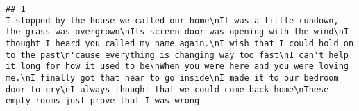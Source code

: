 \documentclass[]{article}
\begin{document}
\begin{verbatim}
## 1                                                                                                                                                                                                                                                                                                                                                                                                                                                                                                                                                                                                                                                                                                                                                                                                                                                                                                                                                                                                                                                                                                                                                                                                                                                                                                                                                                                                                                                                                                                                                                                                                                                                                                                                                                                                                                                                                                                                                                                                                                                                                                                                                                                                                                                                                                                                                                                                                                                                                                                                                                                                 I stopped by the house we called our home\nIt was a little rundown, the grass was overgrown\nIts screen door was opening with the wind\nI thought I heard you called my name again.\nI wish that I could hold on to the past\n'cause everything is changing way too fast\nI can't help it long for how it used to be\nWhen you were here and you were loving me.\nI finally got that near to go inside\nI made it to our bedroom door to cry\nI always thought that we could come back home\nThese empty rooms just prove that I was wrong

\end{verbatim}
\end{document}
